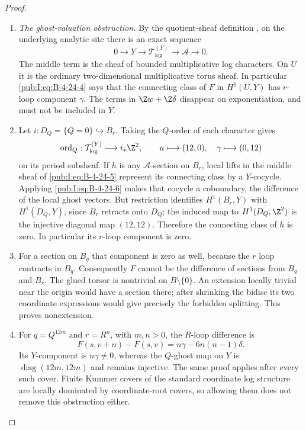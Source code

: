 \begin{proof}
\begin{enumerate}[label=\arabic*.,leftmargin=*]
\item \emph{The ghost-valuation obstruction.}
By the quotient-sheaf definition
\citep[Sections 1.3.1--1.3.4, pp.~81--82]{KKN2008Root},
on the underlying analytic site there is an exact sequence
\begin{equation}
 0\longrightarrow Y\longrightarrow
 \mathcal T_{\log}^{(Y)}\longrightarrow
 \mathcal A\longrightarrow0.
\label{pub:I:eq:B-4-24-5}
\end{equation}
The middle term is the sheaf of bounded multiplicative
log characters. On $U$ it is the ordinary
two-dimensional multiplicative torus sheaf.
In particular \eqref{pub:I:eq:B-4-24-4} says that the connecting
class of $F$ in $H^1(U,Y)$ has $r$-loop component
$\gamma$. The terms in $\Z w+\Z\delta$ disappear
on exponentiation, and must not be included in $Y$.

\item Let $i:D_Q=\{Q=0\}\hookrightarrow B_r$.
Taking the $Q$-order of each character gives
\begin{equation}
 \operatorname{ord}_Q:
 \mathcal T_{\log}^{(Y)}\longrightarrow i_*\Z^2,
 \qquad
 u\longmapsto(12,0),\quad
 \gamma\longmapsto(0,12)
\label{pub:I:eq:B-4-24-6}
\end{equation}
on its period subsheaf. If $h$ is any
$\mathcal A$-section on $B_r$, local lifts in
the middle sheaf of \eqref{pub:I:eq:B-4-24-5} represent its
connecting class by a $Y$-cocycle. Applying
\eqref{pub:I:eq:B-4-24-6} makes that cocycle a coboundary,
the difference of the local ghost vectors.
But restriction identifies $H^1(B_r,Y)$ with
$H^1(D_Q,Y)$, since $B_r$ retracts onto $D_Q$;
the induced map to $H^1(D_Q,\Z^2)$ is the
injective diagonal map $(12,12)$. Therefore
the connecting class of $h$ is zero. In
particular its $r$-loop component is zero.

\item For a section on $B_q$ that component is zero
as well, because the $r$ loop contracts in $B_q$.
Consequently $F$ cannot be the difference of
sections from $B_q$ and $B_r$. The glued torsor
is nontrivial on $B\setminus\{0\}$. An extension
locally trivial near the origin would have a
section there; after shrinking the bidisc its
two coordinate expressions would give precisely
the forbidden splitting. This proves nonextension.

\item For $q=Q^{12m}$ and $r=R^n$, with $m,n>0$,
the $R$-loop difference is
\[
 F(s,v+n)-F(s,v)
    =n\gamma-6n(n-1)\delta.
\]
Its $Y$-component is $n\gamma\ne0$,
whereas the $Q$-ghost map on $Y$ is
$\operatorname{diag}(12m,12m)$ and remains
injective. The same proof applies after every
such cover. Finite Kummer covers of the standard
coordinate log structure are locally dominated
by coordinate-root covers, so allowing them
does not remove this obstruction either.


\end{enumerate}
\end{proof}

